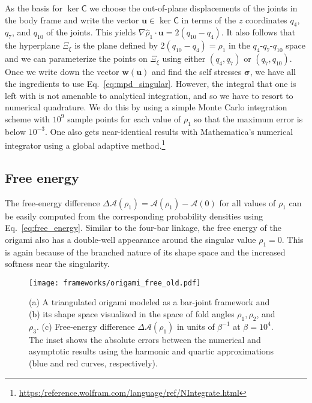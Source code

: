 As the basis for $\ker\mathsf{C}$ we choose the out-of-plane displacements of the joints in the body frame and write the vector $\bm{u} \in \ker \mathsf{C}$ in terms of the $z$ coordinates $q_{4}$, $q_{7}$, and $q_{10}$ of the joints.
This yields $\nabla\hat{\rho}_{1}\cdot\bm{u} = 2(q_{10} - q_{4})$.
It also follows that the hyperplane $\Xi_{\xi}$ is the plane defined by $2(q_{10} - q_{4}) = \rho_{1}$ in the $q_{4}$-$q_{7}$-$q_{10}$ space and we can parameterize the points on $\Xi_{\xi}$ using either $(q_{4}, q_{7})$ or $(q_{7}, q_{10})$.
Once we write down the vector $\bm{w}(\bm{u})$ and find the self stresses $\bm{\sigma}$, we have all the ingredients to use Eq.~\eqref{eq:mpd_singular}.
However, the integral that one is left with is not amenable to analytical integration, and so we have to resort to numerical quadrature.
We do this by using a simple Monte Carlo integration scheme with $10^{9}$ sample points for each value of $\rho_{1}$ so that the maximum error is below $10^{-3}$.
One also gets near-identical results with Mathematica's numerical integrator using a global adaptive method.\footnote{\url{https:/reference.wolfram.com/language/ref/NIntegrate.html}}

\subsection{Free energy}

The free-energy difference $\Delta\mathscr{A}(\rho_{1}) = \mathscr{A}(\rho_{1}) - \mathscr{A}(0)$ for all values of $\rho_{1}$ can be easily computed from the corresponding probability densities using Eq.~\eqref{eq:free_energy}.
Similar to the four-bar linkage, the free energy of the origami also has a double-well appearance around the singular value $\rho_{1} = 0$.
This is again because of the branched nature of its shape space and the increased softness near the singularity.
%
\begin{figure*}
  \begin{center}
    \texttt{[image: frameworks/origami\_free\_old.pdf]}
  \end{center}
  \caption{(a) A triangulated origami modeled as a bar-joint framework and (b) its shape space visualized in the space of fold angles $\rho_{1}, \rho_{2}$, and $\rho_{3}$.
    (c) Free-energy difference $\Delta\mathscr{A}(\rho_{1})$ in units of $\beta^{-1}$ at $\beta = 10^{4}$.
  The inset shows the absolute errors between the numerical and asymptotic results using the harmonic and quartic approximations (blue and red curves, respectively).}
  \label{fig:origami_free}
\end{figure*}

